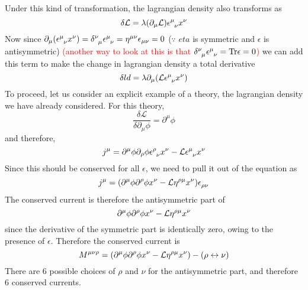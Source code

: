 \documentclass[11pt, notitlepage]{report}
\newcommand{\del}{\partial}
\newcommand{\ld}{\mathcal{L}}
\numberwithin{equation}{section}
\begin{document}
    Under this kind of transformation, the lagrangian density also transforms as 
    \begin{equation*}
        \delta \ld = \lambda (\del_\mu \ld) \epsilon\indices{^\mu_\nu} x^\nu 
    \end{equation*}
    Now since \(\del_\mu (\epsilon\indices{^\mu_\nu} x^\nu) = \delta\indices{^\nu_\mu}\epsilon\indices{^\mu_\nu} = \eta^{\mu\nu}\epsilon_{\mu\nu} = 0\) (\(\because\) \(eta\) is symmetric and \(\epsilon\) is antisymmetric) \textcolor{red}{(another way to look at this is that \(\delta\indices{^\nu_\mu}\epsilon\indices{^\mu_\nu} = \mathrm{Tr}\epsilon = 0\))} we can add this term to make the change in lagrangian density a total derivative 
    \begin{equation*}
        \delta ld = \lambda \del_\mu (\ld \epsilon\indices{^\mu_\nu} x^\nu)
    \end{equation*}
    To proceed, let us consider an explicit example of a theory, the lagrangian density we have already considered. For this theory, 
    \begin{equation*}
        \frac{\delta \ld}{\delta \del_\mu \phi} = \del^\mu \phi
    \end{equation*}
    and therefore, 
    \begin{equation*}
        j^\mu = \del^\mu \phi \del_\rho \phi \epsilon\indices{^\rho_\nu}x^\nu - \ld \epsilon\indices{^\mu_\nu} x^\nu
    \end{equation*}
    Since this should be conserved for all \(\epsilon\), we need to pull it out of the equation as 
    \begin{equation*}
        j^\mu = (\del^\mu \phi \del^\rho \phi x^\nu - \ld \eta\indices{^\rho^\mu} x^\nu)\epsilon\indices{_\rho_\nu}
    \end{equation*}
    The conserved current is therefore the antisymmetric part of 
    \begin{equation*}
        \del^\mu \phi \del^\rho \phi x^\nu - \ld \eta\indices{^\rho^\mu} x^\nu
    \end{equation*}
    since the derivative of the symmetric part is identically zero, owing to the presence of \(\epsilon\). Therefore the conserved current is 
    \begin{equation*}
        M^{\mu\nu\rho} = (\del^\mu \phi \del^\rho \phi x^\nu - \ld \eta\indices{^\rho^\mu} x^\nu) - (\rho\leftrightarrow \nu)
    \end{equation*}
    There are 6 possible choices of \(\rho\) and \(\nu\) for the antisymmetric part, and therefore 6 conserved currents. \\
\end{document}
